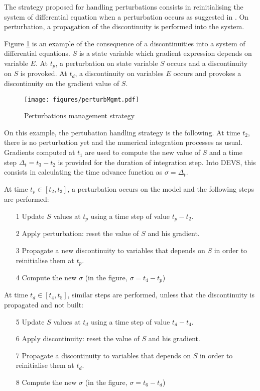 \documentclass{article}
\theoremstyle{remark}
\begin{document}
The strategy proposed for handling perturbations consists in reinitialising the
system of differential equation when a perturbation occurs as suggested
in \cite{cellier.06}. On perturbation, a propagation of the discontinuity is
performed into the system.

Figure \ref{fig:pertMgmt} is an example of the consequence of a
discontinuities into a system of differential equations. $S$ is a state variable
which gradient expression depends on variable $E$. At $t_p$, a perturbation on
state variable $S$ occurs and a discontinuity on $S$ is provoked. At $t_d$,
a discontinuity on variables $E$ occurs and provokes a discontinuity on the
gradient value of $S$.

\begin{figure}[!h]
\begin{center} 
\texttt{[image: figures/perturbMgmt.pdf]}
\caption{\label{fig:pertMgmt} Perturbations management strategy}
\end{center}
\end{figure}

On this example, the pertubation handling strategy is the following.
At time $t_2$, there is no perturbation yet and the numerical
integration processes as usual. 
Gradients computed at $t_1$ are used to compute the new value of $S$ and
a time step $\Delta_t = t_3 - t_2$ is provided for the duration of 
integration step. Into DEVS, this consists in calculating the time advance
function as $\sigma = \Delta_t$.

At time $t_p \in [t_2, t_3]$, a perturbation occurs on the model and the
following steps are performed:
\begin{itemize}
  \item[1] Update $S$ values at $t_p$  using a time step of value $t_p - t_2$.
  \item[2] Apply perturbation: reset the value of $S$ and his gradient.
  \item[3] Propagate a new discontinuity to variables that depends on $S$ in
  order to reinitialise them at $t_p$.
  \item[4] Compute the new $\sigma$ (in the figure, $\sigma = t_4 - t_p$)
\end{itemize}

At time $t_d \in [t_4, t_5]$, similar steps are performed, unless that
the discontinuity is propagated and not built:
\begin{itemize}
  \item[5] Update $S$ values at $t_d$  using a time step of value 
  $t_d - t_4$.
  \item[6] Apply discontinuity: reset the value of $S$ and his gradient.
  \item[7] Propagate a discontinuity to variables that depends on $S$ in order 
  to reinitialise them at $t_d$.
  \item[8] Compute the new $\sigma$ (in the figure, $\sigma = t_6 - t_d$)
\end{itemize}
\end{document}
